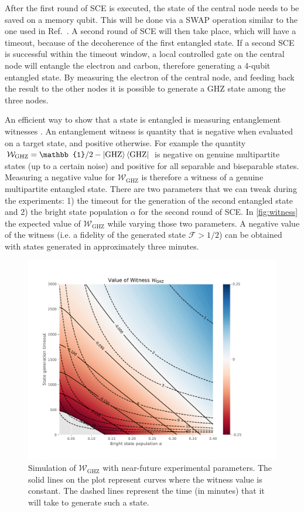 \documentclass[a4paper, twoside]{article}
\begin{document}
After the first round of \ac{SCE} is executed, the state of the central node needs to be saved on a memory qubit. This will be done via a SWAP operation similar to the one used in Ref.~\cite{Kalb2017}.
A second round of \ac{SCE} will then take place, which will have a timeout, because of the decoherence of the first entangled state. If a second \ac{SCE} is successful within the timeout window, a local controlled gate on the central node will entangle the electron and carbon, therefore generating a 4-qubit entangled state. By measuring the electron of the central node, and feeding back the result to the other nodes it is possible to generate a GHZ state among the three nodes.

An efficient way to show that a state is entangled is measuring entanglement witnesses \cite{Guehne2009}. An entanglement witness is quantity that is negative when evaluated on a target state, and positive otherwise. For example the quantity $\mathcal W_\text{GHZ} = \mathbb{1}/2 - \ket{\text{GHZ}}\bra{\text{GHZ}}$ is negative on genuine multipartite states (up to a certain noise) and positive for all separable and biseparable states. Measuring a negative value for $\mathcal W_\text{GHZ}$ is therefore a witness of a genuine multipartite entangled state. There are two parameters that we can tweak during the experiments: 1) the timeout for the generation of the second entangled state and 2) the bright state population $\alpha$ for the second round of \ac{SCE}. In \autoref{fig:witness} the expected value of $\mathcal W_\text{GHZ}$ while varying those two parameters. A negative value of the witness (i.e. a fidelity of the generated state $\mathcal{F} > 1/2$) can be obtained with states generated in approximately three minutes.

\begin{figure}
	\includegraphics[width=\textwidth, trim=1cm 1cm 3cm 1cm 0cm]{images/witness.pdf}
	\caption{Simulation of $\mathcal W_\text{GHZ}$ with near-future experimental parameters. The solid lines on the plot represent curves where the witness value is constant. The dashed lines represent the time (in minutes) that it will take to generate such a state.}
	\label{fig:witness}
\end{figure}
\end{document}

